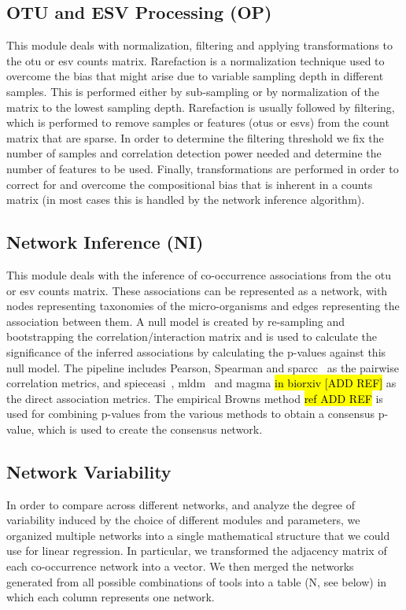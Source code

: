   \subsection*{OTU and ESV Processing (OP)}
  \vspace{-5mm}
  This module deals with normalization, filtering and applying transformations to the \ac{otu} or \ac{esv} counts matrix.
  Rarefaction is a normalization technique used to overcome the bias that might arise due to variable sampling depth in different samples. This is performed either by sub-sampling or by normalization of the matrix to the lowest sampling depth.
  Rarefaction is usually followed by filtering, which is performed to remove samples or features (\ac{otu}s or \ac{esv}s) from the count matrix that are sparse. In order to determine the filtering threshold we fix the number of samples and correlation detection power needed and determine the number of features to be used.
  Finally, transformations are performed in order to correct for and overcome the compositional bias that is inherent in a counts matrix (in most cases this is handled by the network inference algorithm).

  \subsection*{Network Inference (NI)}
  \vspace{-5mm}
  This module deals with the inference of co-occurrence associations from the \ac{otu} or \ac{esv} counts matrix.
  These associations can be represented as a network, with nodes representing taxonomies of the micro-organisms and edges representing the association between them.
  A null model is created by re-sampling and bootstrapping the correlation/interaction matrix and is used to calculate the significance of the inferred associations by calculating the p-values against this null model.
  The pipeline includes Pearson, Spearman and \ac{sparcc}~\cite{Friedman2012} as the pairwise correlation metrics, and \ac{spieceasi}~\cite{Kurtz2015}, \ac{mldm}~\cite{Yang2017} and \ac{magma} \hl{in biorxiv [ADD REF]} as the direct association metrics.
  The empirical Browns method \hl{ref ADD REF} is used for combining p-values from the various methods to obtain a consensus p-value, which is used to create the consensus network.

  \subsection*{Network Variability}
  \vspace{-5mm}
  In order to compare across different networks, and analyze the degree of variability induced by the choice of different modules and parameters, we organized multiple networks into a single mathematical structure that we could use for linear regression. In particular, we transformed the adjacency matrix of each co-occurrence network into a vector. We then merged the networks generated from all possible combinations of tools into a table (N, see below) in which each column represents one network.
  
